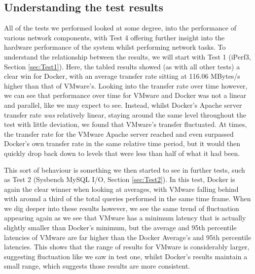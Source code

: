 \subsection{Understanding the test results}
All of the tests we performed looked at some degree, into the performance of various network components, with Test 4 offering further insight into the hardware performance of the system whilst performing network tasks. To understand the relationship between the results, we will start with Test 1 (iPerf3, Section \ref{sec:Test1}). Here, the tabled results showed (as with all other tests) a clear win for Docker, with an average transfer rate sitting at 116.06 MBytes/s higher than that of VMware's. Looking into the transfer rate over time however, we can see that performance over time for VMware and Docker was not a linear and parallel, like we may expect to see. Instead, whilst Docker's Apache server transfer rate \emph{was} relatively linear, staying around the same level throughout the test with little deviation, we found that VMware's transfer fluctuated. At times, the transfer rate for the VMware Apache server reached and even surpassed Docker's own transfer rate in the same relative time period, but it would then quickly drop back down to levels that were less than half of what it had been.

This sort of behaviour is something we then started to see in further tests, such as Test 2 (Sysbench MySQL I/O, Section \ref{sec:Test2}). In this test, Docker is again the clear winner when looking at averages, with VMware falling behind with around a third of the total queries performed in the same time frame. When we dig deeper into these results however, we see the same trend of fluctuation appearing again as we see that VMware has a minimum latency that is actually slightly smaller than Docker's minimum, but the average and 95th percentile latencies of VMware are far higher than the Docker Average's and 95th percentile latencies. This shows that the range of results for VMware is considerably larger, suggesting fluctuation like we saw in test one, whilst Docker's results maintain a small range, which suggests those results are more consistent.

